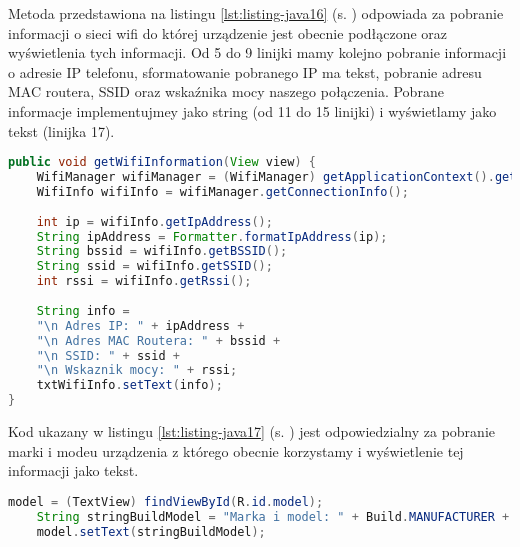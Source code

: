\newpage

Metoda przedstawiona na listingu \ref{lst:listing-java16} (s. \pageref{lst:listing-java16}) odpowiada za pobranie informacji o sieci wifi do której urządzenie jest obecnie podłączone oraz wyświetlenia tych informacji. Od 5 do 9 linijki mamy kolejno pobranie informacji o adresie IP telefonu, sformatowanie pobranego IP ma tekst, pobranie adresu MAC routera, SSID oraz wskaźnika mocy naszego połączenia. Pobrane informacje implementujmey jako string (od 11 do 15 linijki) i wyświetlamy jako tekst (linijka 17).
\begin{lstlisting}[caption=Wifi - Pobieranie informacji o Wifi, label={lst:listing-java16}, language=Java]
    public void getWifiInformation(View view) {
	WifiManager wifiManager = (WifiManager) getApplicationContext().getSystemService(WIFI_SERVICE);
	WifiInfo wifiInfo = wifiManager.getConnectionInfo();
	
	int ip = wifiInfo.getIpAddress();
	String ipAddress = Formatter.formatIpAddress(ip);
	String bssid = wifiInfo.getBSSID();
	String ssid = wifiInfo.getSSID();
	int rssi = wifiInfo.getRssi();
		
	String info =
	"\n Adres IP: " + ipAddress +
	"\n Adres MAC Routera: " + bssid +
	"\n SSID: " + ssid +
	"\n Wskaznik mocy: " + rssi;
	txtWifiInfo.setText(info);	
}
\end{lstlisting}


Kod ukazany w listingu \ref{lst:listing-java17} (s. \pageref{lst:listing-java17}) jest odpowiedzialny za pobranie marki i modeu urządzenia z którego obecnie korzystamy i wyświetlenie tej informacji jako tekst.
\begin{lstlisting}[caption=Wyniki - Pobranie marki i modelu urządzenia, label={lst:listing-java17}, language=Java]
	model = (TextView) findViewById(R.id.model);
	String stringBuildModel = "Marka i model: " + Build.MANUFACTURER + " " + Build.MODEL;
	model.setText(stringBuildModel);
\end{lstlisting}


